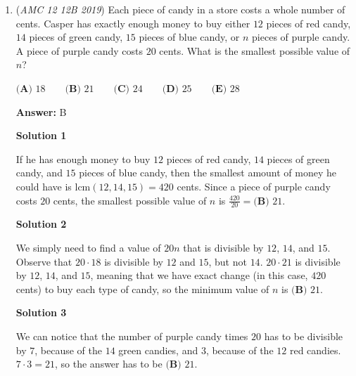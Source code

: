 \begin{enumerate}
 Because $n$ is an integer, assume 1764 is a perfect square. The last digit of 1764 is 4, meaning that the number $k^2 = 1764$, $k$ ends in either 2 or 8. Then, $\sqrt{16} < \sqrt{17} < \sqrt{25}$, so taking the former of the two, we have that our possible square roots are 42 or 48. It then follows that $40^2 < k^2 < 50^2$, and that $k^2$ is much closer to $40^2$ than $50^2$, so our desired $k = 42$. It follows that $n = 19$ and the sum of the digits is $\boxed{10}$.

 To learn this mental math trick, the video below credited to the Organic Chemistry Tutor quite well verses this topic.

 


	\item (\textit{AMC 12 12B 2019}) Each piece of candy in a store costs a whole number of cents. Casper has exactly enough money to buy either $12$ pieces of red candy, $14$ pieces of green candy, $15$ pieces of blue candy, or $n$ pieces of purple candy. A piece of purple candy costs $20$ cents. What is the smallest possible value of $n$?


 $\textbf{(A) } 18 \qquad \textbf{(B) } 21 \qquad \textbf{(C) } 24\qquad \textbf{(D) } 25 \qquad \textbf{(E) } 28$

 \textbf{Answer: }B



\textbf{Solution 1}

If he has enough money to buy $12$ pieces of red candy, $14$ pieces of green candy, and $15$ pieces of blue candy, then the smallest amount of money he could have is $\text{lcm}{(12,14,15)} = 420$ cents. Since a piece of purple candy costs $20$ cents, the smallest possible value of $n$ is $\frac{420}{20} = \boxed{\textbf{(B) }  21}$.

 



\textbf{Solution 2}

We simply need to find a value of $20n$ that is divisible by $12$, $14$, and $15$. Observe that $20 \cdot 18$ is divisible by $12$ and $15$, but not $14$. $20 \cdot 21$ is divisible by $12$, $14$, and $15$, meaning that we have exact change (in this case, $420$ cents) to buy each type of candy, so the minimum value of $n$ is $\boxed{\textbf{(B) }  21}$.

 



\textbf{Solution 3}

We can notice that the number of purple candy times $20$ has to be divisible by $7$, because of the $14$ green candies, and $3$, because of the $12$ red candies. $7\cdot3=21$, so the answer has to be $\boxed{\textbf{(B) }  21}$.


\end{enumerate}

